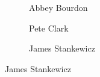 \begin{frame}[plain]
\begin{figure}[h]
\begin{subfigure}{0.30\textwidth}
	\caption{\scriptsize Abbey Bourdon}
	\end{subfigure}
	\begin{subfigure}{0.30\textwidth}
	\captionsetup{labelformat=empty}
	\centering
	\caption{\scriptsize Pete Clark}
	\end{subfigure}
	\begin{subfigure}{0.30\textwidth}
	\captionsetup{labelformat=empty}
	\centering
	\caption{\scriptsize James Stankewicz}
	\end{subfigure}
	\end{figure}
\end{frame}





